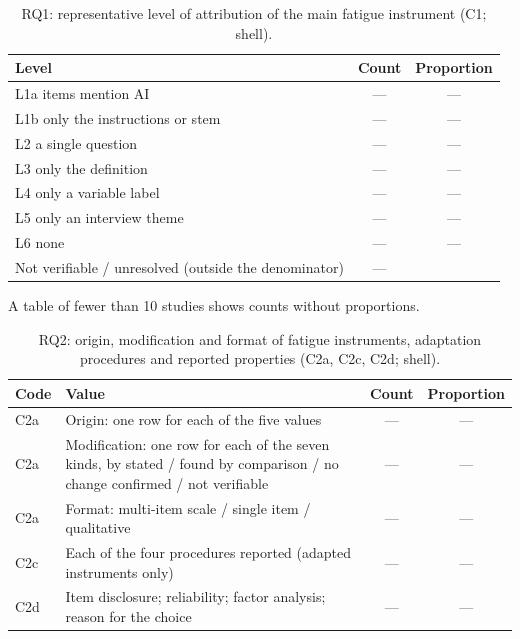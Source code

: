 \begin{table}[!htbp]
\centering
\caption{RQ1: representative level of attribution of the main fatigue instrument (C1; shell).}
\small
\begin{tabularx}{\linewidth}{Xcc}
\toprule
Level & Count & Proportion \\
\midrule
L1a items mention AI & --- & --- \\
L1b only the instructions or stem & --- & --- \\
L2 a single question & --- & --- \\
L3 only the definition & --- & --- \\
L4 only a variable label & --- & --- \\
L5 only an interview theme & --- & --- \\
L6 none & --- & --- \\
Not verifiable / unresolved (outside the denominator) & --- & \\
\bottomrule
\end{tabularx}

\smallskip
\raggedright\footnotesize A table of fewer than 10 studies shows counts without proportions.
\end{table}

\begin{table}[!htbp]
\centering
\caption{RQ2: origin, modification and format of fatigue instruments, adaptation procedures and reported
properties (C2a, C2c, C2d; shell).}
\small
\begin{tabularx}{\linewidth}{lXcc}
\toprule
Code & Value & Count & Proportion \\
\midrule
C2a & Origin: one row for each of the five values & --- & --- \\
C2a & Modification: one row for each of the seven kinds, by stated / found by comparison / no change confirmed / not verifiable & --- & --- \\
C2a & Format: multi-item scale / single item / qualitative & --- & --- \\
C2c & Each of the four procedures reported (adapted instruments only) & --- & --- \\
C2d & Item disclosure; reliability; factor analysis; reason for the choice & --- & --- \\
\bottomrule
\end{tabularx}
\end{table}

